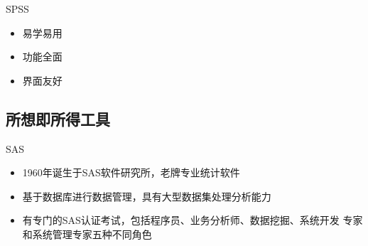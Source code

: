 \begin{frame}[t]{\subsecname}{SPSS}
  \begin{itemize}
    \item<1-> 易学易用
    \item<2-> 功能全面
    \item<3-> 界面友好
  \end{itemize}

\begin{overlayarea}  {\textwidth}{\textheight}
   
\end{overlayarea}
\end{frame}

\subsection{所想即所得工具}
\begin{frame}[t]{\subsecname}{SAS}
  \begin{itemize}
    \item<1-> 1960年诞生于SAS软件研究所，老牌专业统计软件
    \item<2-> 基于数据库进行数据管理，具有大型数据集处理分析能力
    \item<3-> 有专门的SAS认证考试，包括程序员、业务分析师、数据挖掘、系统开发
           专家和系统管理专家五种不同角色
  \end{itemize}
  
  \begin{overlayarea} {\textwidth}{\textheight}
  \end{overlayarea}
\end{frame}


